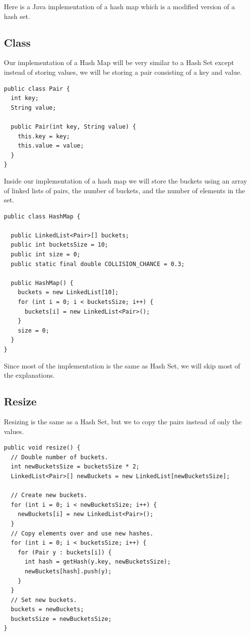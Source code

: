 \documentclass[11pt,oneside]{book}
\begin{document}
Here is a Java implementation of a hash map which is a modified version of a hash set.

\subsection{Class}

Our implementation of a Hash Map will be very similar to a Hash Set except instead of storing values, we will be storing a pair consisting of a key and value.

\begin{lstlisting}
public class Pair {
  int key;
  String value;

  public Pair(int key, String value) {
    this.key = key;
    this.value = value;
  }
}
\end{lstlisting}

Inside our implementation of a hash map we will store the buckets using an array of linked lists of pairs, the number of buckets, and the number of elements in the set.

\begin{lstlisting}
public class HashMap {

  public LinkedList<Pair>[] buckets;
  public int bucketsSize = 10;
  public int size = 0;
  public static final double COLLISION_CHANCE = 0.3;

  public HashMap() {
    buckets = new LinkedList[10];
    for (int i = 0; i < bucketsSize; i++) {
      buckets[i] = new LinkedList<Pair>();
    }
    size = 0;
  }
}
\end{lstlisting}

Since most of the implementation is the same as Hash Set, we will skip most of the explanations.

\subsection{Resize}

Resizing is the same as a Hash Set, but we to copy the pairs instead of only the values.

\begin{lstlisting}
public void resize() {
  // Double number of buckets.
  int newBucketsSize = bucketsSize * 2;
  LinkedList<Pair>[] newBuckets = new LinkedList[newBucketsSize];
  
  // Create new buckets.
  for (int i = 0; i < newBucketsSize; i++) {
    newBuckets[i] = new LinkedList<Pair>();
  }
  // Copy elements over and use new hashes.
  for (int i = 0; i < bucketsSize; i++) {
    for (Pair y : buckets[i]) {
      int hash = getHash(y.key, newBucketsSize);
      newBuckets[hash].push(y);
    }
  }
  // Set new buckets.
  buckets = newBuckets;
  bucketsSize = newBucketsSize;
}
\end{lstlisting}
\end{document}
